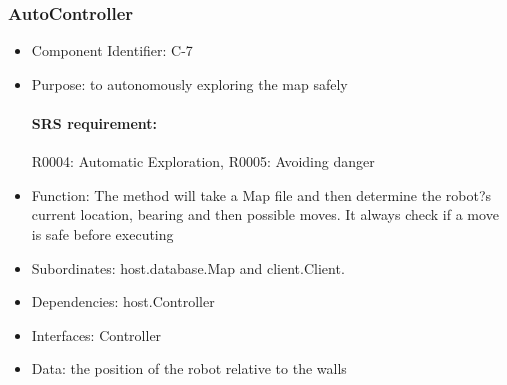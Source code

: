 \documentclass[11pt, a4paper]{report}
\begin{document}
\subsubsection{AutoController}
\begin{itemize}
\item Component Identifier: C-7
\item Purpose: to autonomously exploring the map safely
\paragraph{SRS requirement:} R0004: Automatic Exploration, R0005: Avoiding danger
\item Function: The method will take a Map file and then determine the robot?s current location, bearing and then possible moves.
It always check if a move is safe before  executing
\item Subordinates: host.database.Map and client.Client.
\item Dependencies: host.Controller
\item Interfaces: Controller
\item Data: the position of the robot relative to the walls
\end{itemize}
\end{document}
